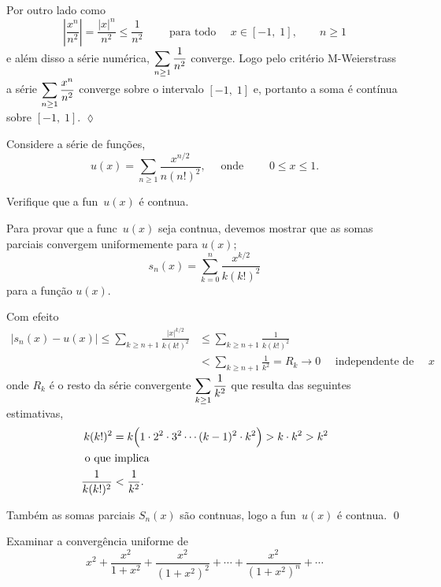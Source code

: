 Por outro lado como
\begin{equation*}
\left|\frac{x^n}{n^2} \right|=\frac{|x|^n}{n^2} \le \frac{1}{n^2}\qquad \text{ para todo } 
\quad x\in [-1, \; 1],\qquad n\ge 1
\end{equation*}
e além disso  a série numérica, $\displaystyle{\sum_{n\ge 1}
\frac{1}{n^2}}$ converge. Logo pelo critério  M-Weierstrass a
série $\displaystyle{\sum_{n\ge 1} \frac{x^n}{n^2}}$ converge \unif sobre o
intervalo $[-1,\; 1]$ e, portanto a soma é contínua sobre
$[-1,\; 1]$. \hfill \(\lozenge\)

\begin{exer}
Considere a s\'erie de funções,
\begin{equation*}
  u(x)= \sum_{n\geq 1}\frac{x^{n/2}}{n(n!)^2}, \quad \text{ onde
  }\qquad  0\leq x \leq 1.
\end{equation*}

Verifique que  a fun\cao\ $u(x)$ \'e cont\ii nua.
\end{exer}

\solo  Para provar que a func\ao\ $u(x)$ seja cont\ii nua, devemos
mostrar que as somas parciais convergem uniformemente para $u(x)$;
\begin{equation*}
  s_n(x)=\sum_{k=0}^{n}\frac{x^{k/2}}{k(k!)^2} 
\end{equation*}
\unif para a função $u(x)$.

Com efeito
\begin{equation}\label{marisa2}
\begin{split}
  |s_n(x)-u(x)|\leq \sum_{k\geq n+1}\frac{|x|^{k/2}}{k(k!)^2}&\leq
  \sum_{k\geq n+1}\frac{1}{k(k!)^2}\\[2ex]
  &< \sum_{k\geq n+1} \frac{1}{k^2}=R_k \to 0 \quad \text{ independente
  de } \quad x
 \end{split}
\end{equation}
onde $R_k$ \'e o resto da s\'erie convergente $\displaystyle{\sum_{k\geq 1}
\frac{1}{k^2}}$  que resulta das seguintes estimativas,
\begin{align*}
k(k!)^2&=k\Bigl(1\cdot 2^2\cdot3^2\cdots
(k-1)^2\cdot k^2\Bigr) > k\cdot k^2> k^2\\
\intertext{ o que implica }
 \frac{1}{k(k!)^2}&<\frac{1}{k^2}.
\end{align*}

Tamb\'em as somas parciais $S_n(x)$ s\~ao  cont\ii nuas, logo a
fun\cao\ $u(x)$ \'e cont\ii nua. \qed

\begin{exer}
Examinar a convergência uniforme de
\begin{equation*}
    x^2+\frac{x^2}{1+x^2}+\frac{x^2}{(1+x^2)^2}+\cdots+\frac{x^2}{(1+x^2)^n}+\cdots
\end{equation*}
\end{exer}

